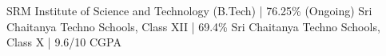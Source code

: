%
%
%


\begin{scholarship}
					{SRM Institute of Science and Technology (B.Tech) | 76.25\% (Ongoing)}
					{Sri Chaitanya Techno Schools, Class XII  |  69.4\%}
					{Sri Chaitanya Techno Schools, Class X |  9.6/10 CGPA}
			
\end{scholarship}